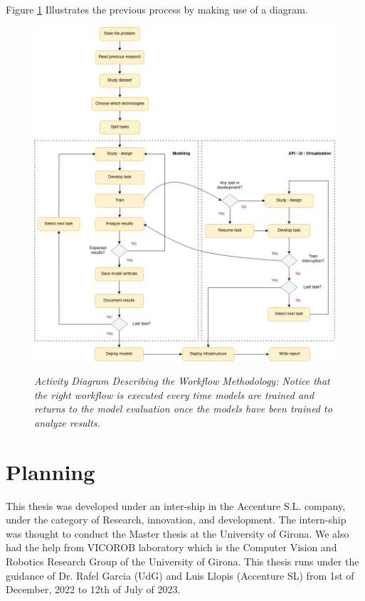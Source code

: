 Figure \ref{fig:flux_development} Illustrates the previous process by making use of a diagram.

\newpage


\begin{figure}[H]
  \centering
  \includegraphics[width=\textwidth]{imatges/planing_and_methodology/EmplyedMethodology.png}
  \caption[Activity Diagram Describing the Methodology.]{\textit{Activity
  Diagram Describing the Workflow Methodology: Notice that the right workflow
  is executed every time models are trained and returns to the model evaluation
  once the models have been trained to analyze results.}}
  {\label{fig:flux_development}}
\end{figure}


\newpage


\section{Planning}

This thesis was developed under an inter-ship in the Accenture S.L. company,
under the category of Research, innovation, and development. The intern-ship
was thought to conduct the Master thesis at the University of Girona. We also
had the help from VICOROB laboratory which is the Computer Vision and Robotics
Research Group of the University of Girona. This thesis runs under the guidance
of Dr. Rafel Garcia (UdG) and Luis Llopis (Accenture SL) from 1st of December,
2022 to 12th of July of 2023. \\

